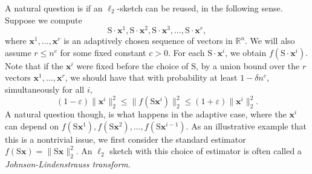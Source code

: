 \documentclass[11pt]{article}
\newcommand{\mat}[1]{{\ensuremath{\bm{\mathrm{#1}}}}}
\def\matS{\mat{S}}
\def\x{{\mathbf x}}
\newcommand{\eps}{\varepsilon}
\begin{document}
A natural question is if an $\ell_2$-sketch can be reused, 
in the following sense. Suppose we compute
$$\matS \cdot \x^1, \matS \cdot \x^2, \matS \cdot \x^3, \ldots, \matS \cdot \x^r,$$
where $\x^1, \ldots, \x^r$ is an adaptively chosen sequence of vectors in $\mathbb{R}^n$. We will also assume
$r \leq n^c$ for some fixed constant $c > 0$.  
For each $\matS\cdot \x^i$, we obtain $f(\matS\cdot \x^i)$. 
Note that if the $\x^i$ were fixed before the choice of $\matS$, 
by a union bound over the $r$ vectors $\x^1, \ldots, \x^r$,
we should have that with probability at least $1-\delta n^c$, 
simultaneously for all $i$, 
$$(1-\eps)\|\x^i\|_2^2 \leq \|f(\matS\x^i)\|_2^2 \leq (1+\eps)\|\x^i\|_2^2.$$
A natural question though, is what happens in the adaptive case, where the $\x^i$ 
can depend on $f(\matS\x^1), f(\matS\x^2), \ldots, f(\matS\x^{i-1})$. 
As an illustrative example that this is a nontrivial issue, 
we first consider the standard estimator $f(\matS\x) = \|\matS\x\|_2^2$. An $\ell_2$ sketch with this choice of
estimator is often called a {\it Johnson-Lindenstrauss transform}. 
\end{document}
